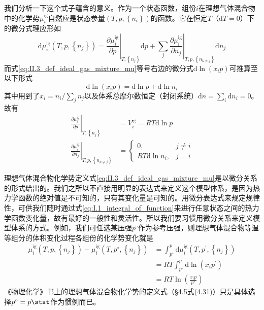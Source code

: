 \documentclass[main.tex]{subfiles}
\begin{document}
我们分析一下这个式子蕴含的意义。作为一个状态函数，组份$i$在理想气体混合物中的化学势$\mu_i^\text{ig}$自然应是状态参量$\left(T,p,\left\{n_i\right\}\right)$的函数。它在恒定$T$（$\mathrm{d}T=0$）下的微分式理应形如
\[\mathrm{d}\mu_i^\text{ig}\left(T,p,\left\{n_j\right\}\right)=\left.\frac{\partial \mu_i^\text{ig}}{\partial p}\right|_{T,\left\{n_j\right\}}\mathrm{d}p+\sum_j\left.\frac{\partial\mu_i^\text{ig}}{\partial n_j}\right|_{T,p,\left\{n_{k\neq j}\right\}}\mathrm{d}n_j\]
而式\eqref{eq:II.3_def_ideal_gas_mixture_mu}等号右边的微分式$\mathrm{d}\ln\left(x_ip\right)$可推算至以下形式
\[\mathrm{d}\ln\left(x_ip\right)=\mathrm{d}\ln p+\mathrm{d}\ln n_i\]
其中用到了$x_i=n_i/\sum_jn_j$以及体系总摩尔数恒定（封闭系统）$\mathrm{d}n=\sum_i\mathrm{d}n_i=0$。故有
\begin{align*}
    \left.\frac{\partial \mu_i^\text{ig}}{\partial p}\right|_{T,\left\{n_j\right\}}             & =V_i^\text{ig}=RT\mathrm{d}\ln p                                                \\
    \left.\frac{\partial \mu_i^\text{ig}}{\partial n_j}\right|_{T,p,\left\{n_{k\neq j}\right\}} & =\left\{\begin{array}{ll}0,&j\neq i\\RT\mathrm{d}\ln n_i,&j=i\end{array}\right.
\end{align*}

理想气体混合物化学势定义式\eqref{eq:II.3_def_ideal_gas_mixture_mu}是以微分关系的形式给出的。我们之所以不直接用明显的表达式来定义这个模型体系，是因为热力学函数的绝对值是不可知的，只有其变化量是可知的。用微分表达式来规定规律性，可供我们随时通过式\eqref{eq:I.1_integral_of_function}来进行任意状态之间的热力学函数变化量，故有最好的一般性和灵活性。所以我们要习惯用微分关系来定义模型体系的方式。例如，我们可任选某压强$p^\circ$作为参考压强，则理想气体混合物等温等组分的体积变化过程各组份的化学势变化就是
\begin{equation}\label{eq:II.3_ideal_gas_mixture_mu_p0}
    \begin{aligned}
        \mu_i^\text{ig}\left(T,p,\left\{n_j\right\}\right)-\mu_i^\text{ig}\left(T,p^\circ,\left\{n_j\right\}\right) & =\int_{p^\circ}^p\mathrm{d}\mu_i^\text{ig}\left(T,p^\prime,\left\{n_j\right\}\right) \\
                                                                                                                    & =RT\int_{p^\circ}^p\mathrm{d}\ln\left(x_ip^\prime\right)                             \\
                                                                                                                    & =RT\ln\left(\frac{x_ip}{p^\circ}\right)
    \end{aligned}
\end{equation}
《物理化学》书上的理想气体混合物化学势的定义式（\S 4.5式(4.31)）只是具体选择$p^\circ=p\stst$作为惯例而已。
\end{document}
